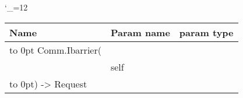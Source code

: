 \begingroup \catcode`\_=12 \tt
\begin{tabular}{lll}
\toprule
\textrm{Name}&\textrm{Param name}&\textrm{param type}\\
\midrule
\hbox to 0pt {Comm.Ibarrier(\hss}\\
& self\\
\hbox to 0pt{) -> Request\hss}\\
\bottomrule
\end{tabular}
\endgroup
